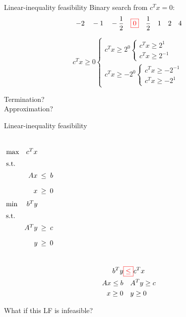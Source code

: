 \begin{frame}{Linear-inequality feasibility}
  Binary search from $c^{T} x = 0$:
  \[
	-2\quad -1\quad -\frac{1}{2}\quad \textcolor{red}{\boxed{0}}\quad \frac{1}{2}\quad 1\quad 2\quad 4
  \]

  \[
	c^{T} x \geq 0 \begin{cases}
	  c^T x \geq 2^0	\begin{cases}
		c^Tx \geq 2^1 \\
		c^Tx \geq 2^{-1}
	  \end{cases} \\
	  c^T x \geq -2^0	\begin{cases}
		c^Tx \geq -2^{-1} \\
		c^Tx \geq -2^1
	  \end{cases}
	\end{cases}
  \]

  \begin{center}
	Termination?\\
	Approximation?
  \end{center}
\end{frame}
\begin{frame}{Linear-inequality feasibility}
  \begin{columns}
	  \begin{equation*}
		\setlength\arraycolsep{2.5pt}
		\begin{array}{l@{\quad}rcc}
		  \max 	& c^{T}x	&	&	\\[5pt]
		  \text{s.t.} 	&	&	&	\\[5pt]
				&	Ax 	&	\leq	&	b	\\[10pt]
				&	x	& 	\geq 	&	0	
		\end{array}
	  \end{equation*}
	  \begin{equation*}
		\setlength\arraycolsep{2.5pt}
		\begin{array}{l@{\quad}rcc}
		  \min 	& b^{T}y	&	&	\\[5pt]
		  \text{s.t.} 	&	&	&	\\[5pt]
				&	A^{T}y 	&	\geq	&	c	\\[10pt]
				&	y	& 	\geq 	&	0	
		\end{array}
	  \end{equation*}
  \end{columns}

  \begin{align*}
	b^{T} y &\textcolor{red}{\boxed{\leq}} c^{T} x	\\
	Ax \leq b	&	\quad	A^{T} y \geq c	\\
	x \geq 0	&	\quad 	y \geq 0
  \end{align*}

  \begin{center}
	 What if this LF is infeasible?
  \end{center}
\end{frame}
